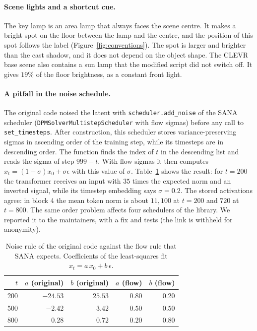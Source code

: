 \documentclass[10pt]{article}
\begin{document}
\paragraph{Scene lights and a shortcut cue.}
The key lamp is an area lamp that always faces the scene centre.
It makes a bright spot on the floor between the lamp and the centre, and the position of this spot follows the label (Figure~\ref{fig:conventions}).
The spot is larger and brighter than the cast shadow, and it does not depend on the object shape.
The CLEVR base scene also contains a sun lamp that the modified script did not switch off. It gives $19\%$ of the floor brightness, as a constant front light.

\paragraph{A pitfall in the noise schedule.}
The original code noised the latent with \texttt{scheduler.add\_noise} of the SANA scheduler (\texttt{DPMSolverMultistepScheduler} with flow sigmas) before any call to \texttt{set\_timesteps}.
After construction, this scheduler stores variance-preserving sigmas in ascending order of the training step, while its timesteps are in descending order.
The function finds the index of $t$ in the descending list and reads the sigma of step $999-t$.
With flow sigmas it then computes $x_t=(1-\sigma)x_0+\sigma\epsilon$ with this value of $\sigma$.
Table~\ref{tab:noise} shows the result: for $t=200$ the transformer receives an input with $35$ times the expected norm and an inverted signal, while its timestep embedding says $\sigma=0.2$.
The stored activations agree: in block 4 the mean token norm is about $11{,}100$ at $t=200$ and $720$ at $t=800$.
The same order problem affects four schedulers of the library. We reported it to the maintainers, with a fix and tests (the link is withheld for anonymity).

\begin{table}[t]
\centering
\caption{Noise rule of the original code against the flow rule that SANA expects. Coefficients of the least-squares fit $x_t=a\,x_0+b\,\epsilon$.}
\label{tab:noise}
\begin{tabular}{rrrrr}
\toprule
$t$ & $a$ (original) & $b$ (original) & $a$ (flow) & $b$ (flow) \\
\midrule
200 & $-24.53$ & $25.53$ & $0.80$ & $0.20$ \\
500 & $-2.42$ & $3.42$ & $0.50$ & $0.50$ \\
800 & $0.28$ & $0.72$ & $0.20$ & $0.80$ \\
\bottomrule
\end{tabular}
\end{table}
\end{document}

